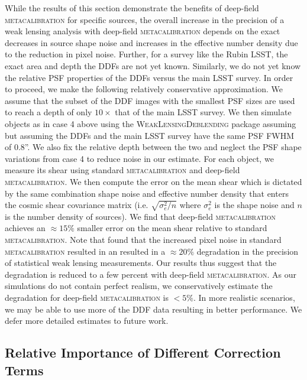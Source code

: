 \documentclass[twocolumn]{openjournal}
\makeatletter
\newcommand{\mcal}{\textsc{metacalibration}\@\xspace}
\newcommand{\descwl}{\textsc{WeakLensingDeblending}\@\xspace}
\makeatother
\begin{document}
While the results of this section demonstrate the benefits of deep-field \mcal for
specific sources, the overall increase in the precision of a weak lensing analysis with
deep-field \mcal depends on the exact decreases in source shape noise and increases in
the effective number density due to the reduction in pixel noise. Further, for a survey
like the Rubin LSST, the exact area and depth the DDFs are not yet known. Similarly, we
do not yet know the relative PSF properties of the DDFs versus the main LSST survey. In
order to proceed, we make the following relatively conservative approximation. We assume
that the subset of the DDF images with the smallest PSF sizes are used to reach a depth
of only $10\times$ that of the main LSST survey. We then simulate objects as in case 4
above using the \descwl package assuming but assuming the DDFs and the main LSST survey
have the same PSF FWHM of 0.8''. We also fix the relative depth between the two and
neglect the PSF shape variations from case 4 to reduce noise in our estimate. For each
object, we measure its shear using standard \mcal and deep-field \mcal. We then compute
the error on the mean shear which is dictated by the same combination shape noise and
effective number density that enters the cosmic shear covariance matrix (i.e.
$\sqrt{\sigma_e^2/n}$ where $\sigma_e^2$ is the shape noise and $n$ is the number density
of sources). We find that deep-field \mcal achieves an $\approx15\%$ smaller
error on the mean shear relative to standard \mcal.  Note that
\citet{SheldonMcal2017} found that the increased pixel noise in standard
\mcal resulted in an resulted in a $\approx 20\%$ degradation in the precision of
statistical weak lensing measurements.  Our results thus suggest that the degradation
is reduced to a few percent with deep-field \mcal.  As our simulations do
not contain perfect realism, we conservatively estimate the degradation for deep-field
\mcal is $<5\%$.  In more realistic scenarios, we may be able to use more of the DDF
data resulting in better performance. We defer more detailed estimates to future work.

\subsection{Relative Importance of Different Correction Terms}\label{sec:terms}
\end{document}
